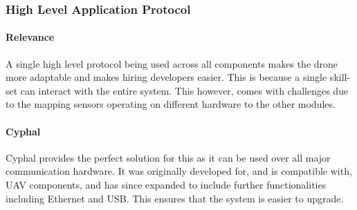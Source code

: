 \subsubsection{High Level Application Protocol}
\paragraph{Relevance}
A single high level protocol being used across all components makes the drone more adaptable and makes hiring developers easier. This is because a single skill-set can interact with the entire system. This however, comes with challenges due to the mapping sensors operating on different hardware to the other modules.
\paragraph{Cyphal}
Cyphal provides the perfect solution for this as it can be used over all major communication hardware. It was originally developed for, and is compatible with, \gls{UAV} components, and has since expanded to include further functionalities including Ethernet and \gls{USB}. This ensures that the system is easier to upgrade.
